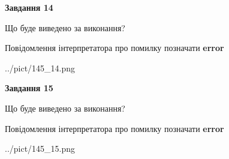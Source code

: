 \documentclass[11pt, ukrainian]{article}
\begin{document}
{\begin {large}
{\begin {center}\textbf{Завдання 14}\end {center}}\par
Що буде виведено за виконання? \par
Повідомлення інтерпретатора про помилку позначати \textbf{error}

\begin{center}
	{../pict/145_14.png}
\end{center}
\newpage

{\begin {center}\textbf{Завдання 15}\end {center}}\par
Що буде виведено за виконання? \par
Повідомлення інтерпретатора про помилку позначати \textbf{error}

\begin{center}
	{../pict/145_15.png}
\end{center}
\newpage

\end {large}}
\end{document}

